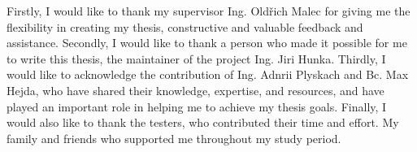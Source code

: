 Firstly, I would like to thank my supervisor Ing. Oldřich Malec for giving me the flexibility in creating my thesis, constructive and valuable feedback and assistance. Secondly, I would like to thank a person who made it possible for me to write this thesis, the maintainer of the project Ing. Jiri Hunka.
Thirdly, I would like to acknowledge the contribution of Ing. Adnrii Plyskach and Bc. Max Hejda, who have shared their knowledge, expertise, and resources, and have played an important role in helping me to achieve my thesis goals.
Finally, I would also like to thank the testers, who contributed their time and effort. My family and friends who supported me throughout my study period.